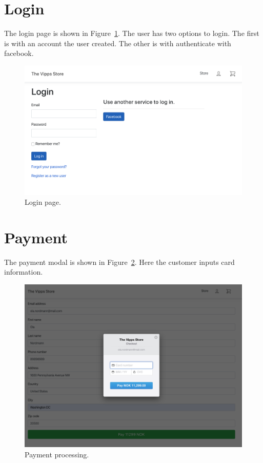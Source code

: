 \documentclass[11pt,a4paper,english]{article}
\begin{document}
\section*{Login}
The login page is shown in Figure~\ref{fig:login}. The user has two options to login. The first is with an account the user created. The other is with authenticate with facebook.
\begin{figure}[htbp]
  \centering
  \includegraphics[scale=0.3]{login}
  \caption{Login page.}
  \label{fig:login}
\end{figure}
\section*{Payment}
The payment modal is shown in Figure~\ref{fig:stripe}. Here the customer inputs card information.
\begin{figure}[htbp]
  \centering
  \includegraphics[scale=0.3]{stripe}
  \caption{Payment processing.}
  \label{fig:stripe}
\end{figure}
\end{document}
